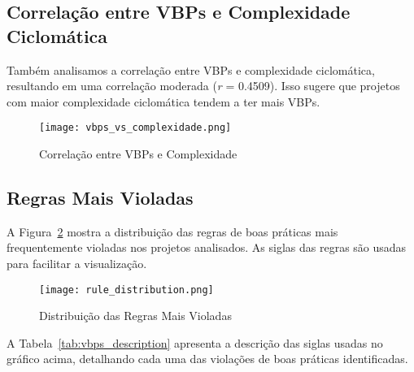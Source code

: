 \documentclass[12pt]{article}
\begin{document}
\subsection{Correlação entre VBPs e Complexidade Ciclomática}
Também analisamos a correlação entre VBPs e complexidade ciclomática, resultando em uma correlação moderada (\textit{r} = 0.4509). Isso sugere que projetos com maior complexidade ciclomática tendem a ter mais VBPs.
\begin{figure}[H]
\centering
\texttt{[image: vbps\_vs\_complexidade.png]}
\caption{Correlação entre VBPs e Complexidade}
\label{fig:vbps_vs_complexidade}
\end{figure}

\subsection{Regras Mais Violadas}
A Figura~\ref{fig:rule_distribution} mostra a distribuição das regras de boas práticas mais frequentemente violadas nos projetos analisados. As siglas das regras são usadas para facilitar a visualização.

\begin{figure}[H]
\centering
\texttt{[image: rule\_distribution.png]}
\caption{Distribuição das Regras Mais Violadas}
\label{fig:rule_distribution}
\end{figure}

A Tabela~\ref{tab:vbps_description} apresenta a descrição das siglas usadas no gráfico acima, detalhando cada uma das violações de boas práticas identificadas.
\end{document}
